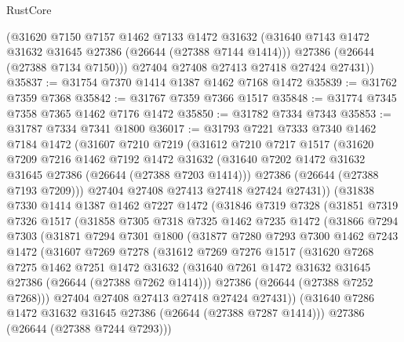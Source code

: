 \begin{lexlean}{RustCore}
\begin{coremodule}
        (@31620
          @7150
          @7157
          @1462
          @7133
          @1472
          @31632
          (@31640 @7143 @1472 @31632 @31645 @27386 (@26644 (@27388 @7144 @1414)))
          @27386
          (@26644 (@27388 @7134 @7150)))
        @27404
        @27408
        @27413
        @27418
        @27424
        @27431))
@35837 := @31754 @7370 @1414 @1387 @1462 @7168 @1472
@35839 := @31762 @7359 @7368
@35842 := @31767 @7359 @7366 @1517
@35848 := @31774 @7345 @7358 @7365 @1462 @7176 @1472
@35850 := @31782 @7334 @7343
@35853 := @31787 @7334 @7341 @1800
@36017 := @31793
    @7221
    @7333
    @7340
    @1462
    @7184
    @1472
    (@31607
      @7210
      @7219
      (@31612
        @7210
        @7217
        @1517
        (@31620
          @7209
          @7216
          @1462
          @7192
          @1472
          @31632
          (@31640 @7202 @1472 @31632 @31645 @27386 (@26644 (@27388 @7203 @1414)))
          @27386
          (@26644 (@27388 @7193 @7209)))
        @27404
        @27408
        @27413
        @27418
        @27424
        @27431))
    (@31838
      @7330
      @1414
      @1387
      @1462
      @7227
      @1472
      (@31846
        @7319
        @7328
        (@31851
          @7319
          @7326
          @1517
          (@31858
            @7305
            @7318
            @7325
            @1462
            @7235
            @1472
            (@31866
              @7294
              @7303
              (@31871
                @7294
                @7301
                @1800
                (@31877
                  @7280
                  @7293
                  @7300
                  @1462
                  @7243
                  @1472
                  (@31607
                    @7269
                    @7278
                    (@31612
                      @7269
                      @7276
                      @1517
                      (@31620
                        @7268
                        @7275
                        @1462
                        @7251
                        @1472
                        @31632
                        (@31640 @7261 @1472 @31632 @31645 @27386 (@26644 (@27388 @7262 @1414)))
                        @27386
                        (@26644 (@27388 @7252 @7268)))
                      @27404
                      @27408
                      @27413
                      @27418
                      @27424
                      @27431))
                  (@31640 @7286 @1472 @31632 @31645 @27386 (@26644 (@27388 @7287 @1414)))
                  @27386
                  (@26644 (@27388 @7244 @7293)))

\end{coremodule}
\end{lexlean}
